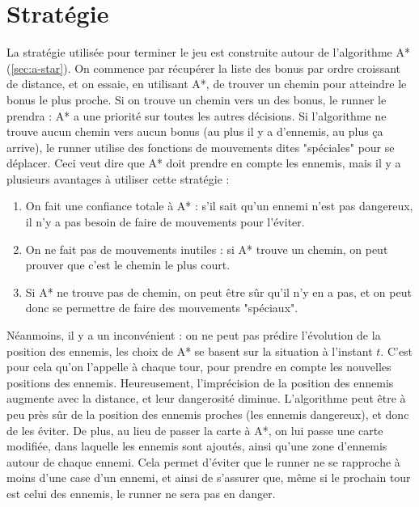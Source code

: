 \chapter{Stratégie}
\label{cp:strategie}

La stratégie utilisée pour terminer le jeu est construite autour de l'algorithme A* (\autoref{sec:a-star}).
\newline
On commence par récupérer la liste des bonus par ordre croissant de distance, et on essaie, en utilisant A*, de trouver un chemin pour atteindre le bonus le plus proche.
\newline
Si on trouve un chemin vers un des bonus, le runner le prendra : A* a une priorité sur toutes les autres décisions.
\newline
Si l'algorithme ne trouve aucun chemin vers aucun bonus (au plus il y a d'ennemis, au plus ça arrive), le runner utilise des fonctions de mouvements dites "spéciales" pour se déplacer.
\newline\newline
Ceci veut dire que A* doit prendre en compte les ennemis, mais il y a plusieurs avantages à utiliser cette stratégie :

\begin{enumerate}
    \item On fait une confiance totale à A* : s'il sait qu'un ennemi n'est pas dangereux, il n'y a pas besoin de faire de mouvements pour l'éviter.
    \item On ne fait pas de mouvements inutiles : si A* trouve un chemin, on peut prouver que c'est le chemin le plus court.
    \item Si A* ne trouve pas de chemin, on peut être sûr qu'il n'y en a pas, et on peut donc se permettre de faire des mouvements "spéciaux".
\end{enumerate}
Néanmoins, il y a un inconvénient : on ne peut pas prédire l'évolution de la position des ennemis, les choix de A* se basent sur la situation à l'instant $t$.
\newline
C'est pour cela qu'on l'appelle à chaque tour, pour prendre en compte les nouvelles positions des ennemis.
\newline\newline
Heureusement, l'imprécision de la position des ennemis augmente avec la distance, et leur dangerosité diminue.
L'algorithme peut être à peu près sûr de la position des ennemis proches (les ennemis dangereux), et donc de les éviter.
\newpage
De plus, au lieu de passer la carte à A*, on lui passe une carte modifiée, dans laquelle les ennemis sont ajoutés, ainsi qu'une zone d'ennemis autour de chaque ennemi.
\newline
Cela permet d'éviter que le runner ne se rapproche à moins d'une case d'un ennemi, et ainsi de s'assurer que, même si le prochain tour est celui des ennemis, le runner ne sera pas en danger.

